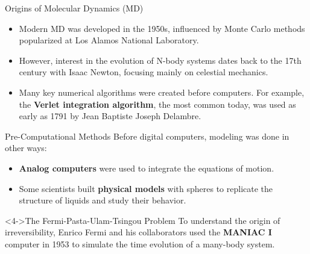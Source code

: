 \begin{frame}{Origins of Molecular Dynamics (MD)}
    \begin{itemize}
        \item Modern MD was developed in the 1950s, influenced by Monte Carlo methods popularized at Los Alamos National Laboratory.
        \pause
        \bigskip
        \item However, interest in the evolution of N-body systems dates back to the 17th century with Isaac Newton, focusing mainly on celestial mechanics.
        \pause
        \bigskip
        \item Many key numerical algorithms were created before computers. For example, the \textbf{Verlet integration algorithm}, the most common today, was used as early as 1791 by Jean Baptiste Joseph Delambre.
    \end{itemize}
\end{frame}

\begin{frame}{Pre-Computational Methods}
    Before digital computers, modeling was done in other ways:
    \pause
    
    \begin{itemize}
        \item \textbf{Analog computers} were used to integrate the equations of motion.
        \pause
        \item Some scientists built \textbf{physical models} with spheres to replicate the structure of liquids and study their behavior.
    \end{itemize}
    \pause
    
    \begin{block}<4->{The Fermi-Pasta-Ulam-Tsingou Problem}
        To understand the origin of irreversibility, Enrico Fermi and his collaborators used the \textbf{MANIAC I} computer in 1953 to simulate the time evolution of a many-body system.
    \end{block}
\end{frame}

